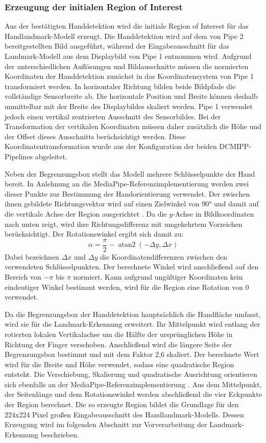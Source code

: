 \subsubsection{Erzeugung der initialen Region of Interest}\label{ssub:initiale-roi}

Aus der bestätigten Handdetektion wird die initiale Region of Interest für das Handlandmark-Modell erzeugt. Die Handdetektion wird auf dem von Pipe 2 bereitgestellten Bild ausgeführt, während der Eingabeausschnitt für das Landmark-Modell aus dem Displaybild von Pipe 1 entnommen wird. Aufgrund der unterschiedlichen Auflösungen und Bildausschnitte müssen die normierten Koordinaten der Handdetektion zunächst in das Koordinatensystem von Pipe 1 transformiert werden. In horizontaler Richtung bilden beide Bildpfade die vollständige Sensorbreite ab. Die horizontale Position und Breite können deshalb unmittelbar mit der Breite des Displaybildes skaliert werden. Pipe 1 verwendet jedoch einen vertikal zentrierten Ausschnitt des Sensorbildes. Bei der Transformation der vertikalen Koordinaten müssen daher zusätzlich die Höhe und der Offset dieses Ausschnitts berücksichtigt werden. Diese Koordinatentransformation wurde aus der Konfiguration der beiden DCMIPP-Pipelines abgeleitet.

Neben der Begrenzungsbox stellt das Modell mehrere Schlüsselpunkte der Hand bereit. In Anlehnung an die MediaPipe-Referenzimplementierung werden zwei dieser Punkte zur Bestimmung der Handorientierung verwendet. Der zwischen ihnen gebildete Richtungsvektor wird auf einen Zielwinkel von 90° und damit auf die vertikale Achse der Region ausgerichtet \cite{srccode_mediapipe}. Da die $y$-Achse in Bildkoordinaten nach unten zeigt, wird ihre Richtungsdifferenz mit umgekehrtem Vorzeichen berücksichtigt. Der Rotationswinkel ergibt sich damit zu:
$$\alpha = \frac{\pi}{2} - \operatorname{atan2}(-\Delta y,\Delta x)$$
Dabei bezeichnen $\Delta x$  und $\Delta y$ die Koordinatendifferenzen zwischen den verwendeten Schlüsselpunkten. Der berechnete Winkel wird anschließend auf den Bereich von $-\pi$ bis $\pi$ normiert. Kann aufgrund ungültiger Koordinaten kein eindeutiger Winkel bestimmt werden, wird für die Region eine Rotation von 0 verwendet.

Da die Begrenzungsbox der Handdetektion hauptsächlich die Handfläche umfasst, wird sie für die Landmark-Erkennung erweitert. Ihr Mittelpunkt wird entlang der rotierten lokalen Vertikalachse um die Hälfte der ursprünglichen Höhe in Richtung der Finger verschoben. Anschließend wird die längere Seite der Begrenzungsbox bestimmt und mit dem Faktor 2,6 skaliert. Der berechnete Wert wird für die Breite und Höhe verwendet, sodass eine quadratische Region entsteht. Die Verschiebung, Skalierung und quadratische Ausrichtung orientieren sich ebenfalls an der MediaPipe-Referenzimplementierung \cite{srccode_mediapipe}. Aus dem Mittelpunkt, der Seitenlänge und dem Rotationswinkel werden abschließend die vier Eckpunkte der Region berechnet. Die so erzeugte Region bildet die Grundlage für den 224x224 Pixel großen Eingabeausschnitt des Handlandmark-Modells. Dessen Erzeugung wird im folgenden Abschnitt zur Vorverarbeitung der Landmark-Erkennung beschrieben.

